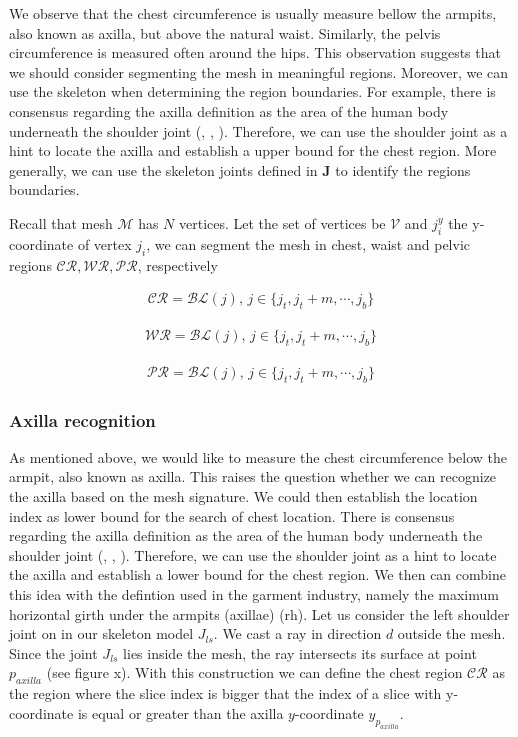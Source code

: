 \documentclass[runningheads, orivec]{llncs}
\begin{document}
We observe that the chest circumference is usually measure bellow the armpits, 
also 
known as axilla, but above the natural waist. Similarly, the pelvis 
circumference is measured often around the hips. This observation suggests that 
we should consider segmenting the mesh in meaningful regions. Moreover, we can 
use the skeleton when determining the region boundaries. For 
example, there is consensus regarding the axilla 
definition as the area of the human body underneath the shoulder joint 
(\cite{MeSH.axilla}, \cite{FMA.axilla}, \cite{TA.axilla}). Therefore, we can 
use the shoulder joint as a hint to locate the axilla and establish a upper 
bound for the chest region. More generally, we can use the 
skeleton joints defined in $\mathbf{J}$ to identify the regions boundaries.

Recall that mesh $\mathcal{M}$ has $N$ vertices. Let the set of vertices be 
$\mathcal{V}$ and $j^y_i$ the y-coordinate of vertex $j_i$, we can segment the 
mesh in chest, waist and pelvic regions 
$\mathcal{CR}, \mathcal{WR}, \mathcal{PR}$, respectively

\begin{align}
\mathcal{CR} = \mathcal{BL}(j), \, j \in \{j_t, j_t+m, \cdots, j_b\}
\end{align}

\begin{align}
\mathcal{WR} = \mathcal{BL}(j), \, j \in \{j_t, j_t+m, \cdots, j_b\}
\end{align}

\begin{align}
\mathcal{PR} = \mathcal{BL}(j), \, j \in \{j_t, j_t+m, \cdots, j_b\}
\end{align}







\subsubsection{Axilla recognition}\label{subsec:armpit_recog}
As mentioned above, we would like to measure the chest circumference below the 
armpit, also known as axilla. This raises the question whether we can recognize 
the axilla based on 
the mesh signature. We could then establish the location index as lower bound 
for the search of chest location. There is consensus regarding the axilla 
definition as the area of the human body underneath the shoulder joint 
(\cite{MeSH.axilla}, \cite{FMA.axilla}, \cite{TA.axilla}). Therefore, we can 
use the shoulder joint as a hint to locate the axilla and establish a lower 
bound for the chest region. We then can combine this idea with the defintion 
used in the garment industry, namely the maximum horizontal girth under the 
armpits (axillae) (rh).
Let us consider the left shoulder joint on in our skeleton model $J_{ls}$. We 
cast a ray in direction $d$ outside the mesh. Since the joint $J_{ls}$ lies 
inside the mesh, the ray intersects its surface at point $p_{axilla}$ (see 
figure x).
With this construction we can define the chest region $\mathcal{CR}$ as the 
region where the slice index is bigger that the index of a slice with 
y-coordinate is equal or greater than the axilla $y$-coordinate 
$y_{p_{axilla}}$.
\end{document}
